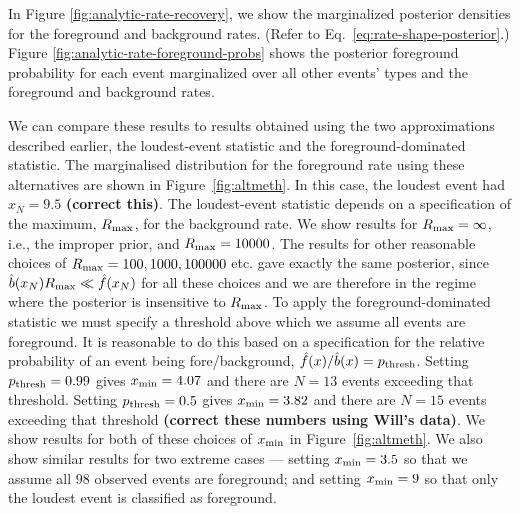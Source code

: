 \documentclass[aps,prd]{revtex4-1}
\newcommand{\jon}[1]{{\color{green} \bf #1}}
\begin{document}
In Figure \ref{fig:analytic-rate-recovery}, we show the marginalized
posterior densities for the foreground and background rates.  (Refer
to Eq.~\eqref{eq:rate-shape-posterior}.)  Figure
\ref{fig:analytic-rate-foreground-probs} shows the posterior
foreground probability for each event marginalized over all other
events' types and the foreground and background rates.

We can compare these results to results obtained using the two
approximations described earlier, the loudest-event statistic and the
foreground-dominated statistic. The marginalised distribution for the
foreground rate using these alternatives are shown in
Figure~\ref{fig:altmeth}. In this case, the loudest event had
$x_N=9.5$\jon{(correct this)}. The loudest-event statistic depends on
a specification of the maximum, $R_{\rm max}$, for the background
rate. We show results for $R_{\rm max}=\infty$, i.e., the improper
prior, and $R_{\rm max}=10000$. The results for other reasonable
choices of $R_{\rm max} = 100, 1000, 100000$ etc. gave exactly the
same posterior, since $\hat{b}(x_N) R_{\rm max} \ll \hat{f}(x_N)$ for
all these choices and we are therefore in the regime where the
posterior is insensitive to $R_{\rm max}$. To apply the
foreground-dominated statistic we must specify a threshold above which
we assume all events are foreground. It is reasonable to do this based
on a specification for the relative probability of an event being
fore/background, $\hat{f}(x)/\hat{b}(x)=p_{\rm thresh}$. Setting
$p_{\rm thresh}=0.99$ gives $x_{\rm min}=4.07$ and there are $N=13$
events exceeding that threshold. Setting $p_{\rm thresh}=0.5$ gives
$x_{\rm min}=3.82$ and there are $N=15$ events exceeding that
threshold \jon{(correct these numbers using Will's data)}. We show
results for both of these choices of $x_{\rm min}$ in
Figure~\ref{fig:altmeth}. We also show similar results for two extreme
cases --- setting $x_{\rm min}=3.5$ so that we assume all $98$
observed events are foreground; and setting $x_{\rm min}=9$ so that
only the loudest event is classified as foreground.
\end{document}
